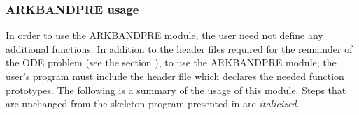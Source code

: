 \documentclass[letterpaper,10pt,english]{sphinxmanual}
\begin{document}
\subsubsection{ARKBANDPRE usage}
\label{c_interface/Preconditioners:arkbandpre-usage}
In order to use the ARKBANDPRE module, the user need not define
any additional functions.  In addition to the header files required
for the remainder of the ODE problem (see the section
{\hyperref[c_interface/General:cinterface-headers]{\emph{}}}), to use the ARKBANDPRE module, the user's
program must include the header file  which
declares the needed function prototypes.  The following is a summary
of the usage of this module.  Steps that are unchanged from the
skeleton program presented in {\hyperref[c_interface/Skeleton:cinterface-skeleton]{\emph{}}} are
\emph{italicized}.
\end{document}
